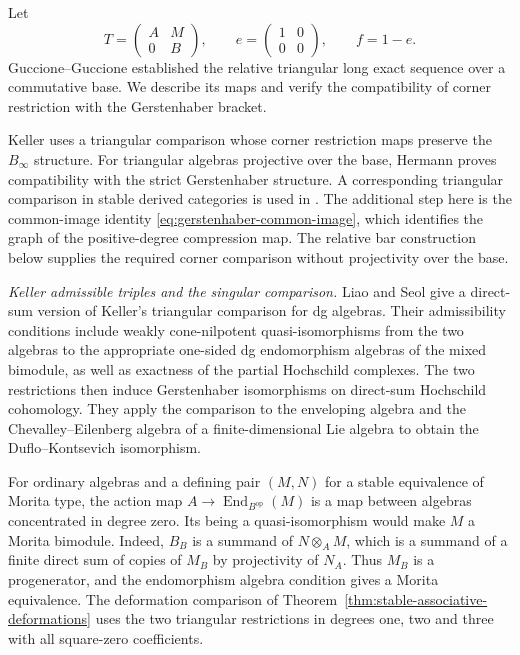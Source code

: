 \documentclass[12pt,a4paper,english,reqno]{amsart}
\numberwithin{equation}{section}
\theoremstyle{plain}
\theoremstyle{definition}
\begin{document}
Let
\[
 T=\begin{pmatrix}A&M\\0&B\end{pmatrix},\qquad
 e=\begin{pmatrix}1&0\\0&0\end{pmatrix},\qquad f=1-e.
\]
Guccione--Guccione \cite[Theorem~1]{GuccioneGuccione2001}
established the relative triangular long exact sequence over a
commutative base.  We describe its maps and verify the compatibility
of corner restriction with the Gerstenhaber bracket.

Keller \cite[Section~4.5]{Keller2003Higher} uses a triangular
comparison whose corner restriction maps preserve the
$B_\infty$ structure.
For triangular algebras projective over the base, Hermann
\cite[Section~6]{Hermann2016Recollements} proves compatibility
with the strict Gerstenhaber structure.  A corresponding triangular
comparison in stable derived categories is used in
\cite{BriggsRubio2022}.  The additional step here is the
common-image identity \eqref{eq:gerstenhaber-common-image}, which
identifies the graph of the positive-degree compression map.
The relative bar construction below supplies the required corner
comparison without projectivity over the base.

\medskip
\noindent\textit{Keller admissible triples and the singular comparison.}
Liao and Seol \cite{LiaoSeol2023} give a direct-sum version
of Keller's triangular comparison for dg algebras. Their
admissibility conditions include weakly cone-nilpotent
quasi-isomorphisms from the two algebras to the appropriate
one-sided dg endomorphism algebras of the mixed bimodule,
as well as exactness of the partial Hochschild complexes.
The two restrictions then induce Gerstenhaber isomorphisms
on direct-sum Hochschild cohomology. They apply the comparison
to the enveloping algebra and the Chevalley--Eilenberg algebra
of a finite-dimensional Lie algebra to obtain the
Duflo--Kontsevich isomorphism.

For ordinary algebras and a defining pair $(M,N)$ for a
stable equivalence of Morita type, the action map
$A\to\operatorname{End}_{B^{\mathrm{op}}}(M)$ is a map
between algebras concentrated in degree zero. Its being
a quasi-isomorphism would make $M$ a Morita bimodule.
Indeed, $B_B$ is a summand of $N\otimes_A M$, which is a
summand of a finite direct sum of copies of $M_B$ by
projectivity of $N_A$. Thus $M_B$ is a progenerator, and
the endomorphism algebra condition gives a Morita equivalence.
The deformation comparison of
Theorem~\ref{thm:stable-associative-deformations} uses the
two triangular restrictions in degrees one, two and three
with all square-zero coefficients.
\end{document}
